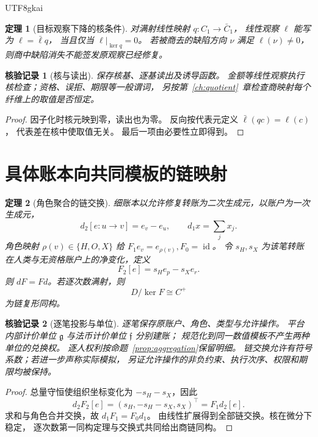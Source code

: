 \documentclass[12pt,a4paper,openany]{report}
\newtheorem{theorem}{定理}[chapter]
\newtheorem{Certificate}{核验记录}[chapter]
\newcommand{\id}{\operatorname{id}}
\begin{document}
\begin{CJK*}{UTF8}{gkai}
\begin{theorem}[目标观察下降的核条件]
\label{thm:readout-kernel}
对满射线性映射 \(q:C_1\to\bar C_1\)，
线性观察 \(\ell\) 能写为 \(\ell=\bar\ell q\)，
当且仅当 \(\ell|_{\ker q}=0\)。
若被商去的缺陷方向 \(\nu\) 满足 \(\ell(\nu)\ne0\)，
则商中缺陷消失不能签发原观察已经修复。
\end{theorem}
\begin{Certificate}[核与读出]
保存核基、逐基读出及诱导函数。
金额等线性观察执行核检查；资格、误拒、期限等一般谓词，
另按第~\ref{ch:quotient}~章检查商映射每个纤维上的取值是否恒定。
\end{Certificate}
\begin{proof}
因子化时核元映到零，读出也为零。
反向按代表元定义 \(\bar\ell(qc)=\ell(c)\)，
代表差在核中使取值无关。
最后一项由必要性立即得到。
\end{proof}

\section{具体账本向共同模板的链映射}
\begin{theorem}[角色聚合的链交换]
\label{thm:chain-map}
细账本以允许修复转账为二次生成元，以账户为一次生成元，
\[
d_2[e:u\to v]=e_v-e_u,\qquad d_1x=\sum_jx_j.
\]
角色映射 \(\rho(v)\in\{H,O,X\}\) 给
\(F_1e_v=e_{\rho(v)},F_0=\id\)。
令 \(s_H,s_X\) 为该笔转账在人类与无资格账户上的净变化，定义
\[
F_2[e]=s_He_p-s_Xe_r.
\]
则 \(dF=Fd\)。若逐次数满射，则
\[
D/\ker F\cong C^+
\]
为链复形同构。
\end{theorem}
\begin{Certificate}[逐笔投影与单位]
逐笔保存原账户、角色、类型与允许操作。
平台内部计价单位 \(\mathfrak g\) 与法币计价单位 \(\mathfrak f\) 分别建账；
规范化到同一数值模板不产生两种单位的兑换权。
逐人权利按命题~\ref{prop:aggregation}保留明细。
链交换允许有符号系数；若进一步声称实际模拟，
另证允许操作的非负约束、执行次序、权限和期限均被保持。
\end{Certificate}
\begin{proof}
总量守恒使组织坐标变化为 \(-s_H-s_X\)，因此
\[
d_2F_2[e]=(s_H,-s_H-s_X,s_X)^\top=F_1d_2[e].
\]
求和与角色合并交换，故 \(d_1F_1=F_0d_1\)。
由线性扩展得到全部链交换。核在微分下稳定，
逐次数第一同构定理与交换式共同给出商链同构。
\end{proof}


\end{CJK*}
\end{document}
